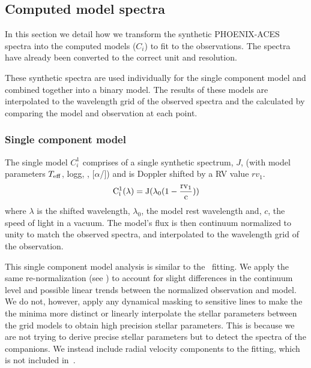 \subsection{Computed model spectra}
\label{models}
In this section we detail how we transform the synthetic {PHOENIX-ACES} spectra into the computed models (\(C_i\)) to fit to the observations. The spectra have already been converted to the correct unit and resolution.

These synthetic spectra are used individually for the single component model and combined together into a binary model. The results of these models are interpolated to the wavelength grid of the observed spectra and the \textchisquared{} calculated by comparing the model and observation at each point.


\subsubsection{Single component model}
\label{subsubsec:single-model}
The single model \(C^{1}_{i}\) comprises of a single synthetic spectrum, \(J\), (with model parameters \(T_{\mathrm{eff}}{}\), logg, \feh{}, [\(\alpha\)/]) and is Doppler shifted by a {RV} value \({rv}_1\).
\begin{equation}
\rm C^{1}_{i}(\lambda) = J(\lambda_0(1-\frac{{rv}_1}{c}))
\end{equation}
where \(\lambda\) is the shifted wavelength, \(\lambda_0\), the model rest wavelength and, \(c\), the speed of light in a vacuum. The model's flux is then continuum normalized to unity to match the observed spectra, and interpolated to the wavelength grid of the observation.

This single component model analysis is similar to the~\citet{passegger_fundamental_2016} \textchisquared{} fitting. We apply the same re-normalization (see ) to account for slight differences in the continuum level and possible linear trends between the normalized observation and model. We do not, however, apply any dynamical masking to sensitive lines to make the the \textchisquared{} minima more distinct or linearly interpolate the stellar parameters between the grid models to obtain high precision stellar parameters. This is because we are not trying to derive precise stellar parameters but to detect the spectra of the companions. We instead include radial velocity components to the \textchisquared{} fitting, which is not included in~\citet{passegger_fundamental_2016}.


